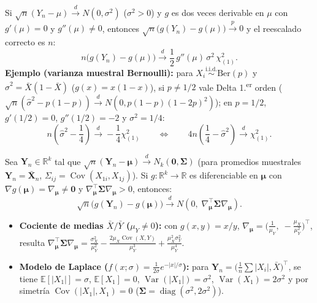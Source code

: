 \documentclass[10pt,a4paper]{article}
\newcommand{\E}{\mathbb{E}}
\newcommand{\R}{\mathbb{R}}
\newcommand{\Var}{\operatorname{Var}}
\newcommand{\Cov}{\operatorname{Cov}}
\newcommand{\iid}{\overset{\text{i.i.d.}}{\sim}}
\newcommand{\dto}{\xrightarrow{\;d\;}}
\newcommand{\pto}{\xrightarrow{\;p\;}}
\begin{document}
\begin{thmbox}[frametitle={Método Delta de 2.\textsuperscript{o} orden (caso degenerado $g'(\mu) = 0$)}]
Si $\sqrt{n}(Y_n - \mu) \dto N(0, \sigma^2)$ ($\sigma^2 > 0$) y $g$ es dos veces derivable en $\mu$ con $g'(\mu) = 0$ y $g''(\mu) \ne 0$, entonces $\sqrt{n}\big(g(Y_n) - g(\mu)\big) \pto 0$ y el reescalado correcto es $n$:
\[
n\big(g(Y_n) - g(\mu)\big) \dto \frac{1}{2}\,g''(\mu)\,\sigma^2\,\chi^2_{(1)}.
\]
\textbf{Ejemplo (varianza muestral Bernoulli):} para $X_i \iid \text{Ber}(p)$ y $\hat\sigma^2 = \bar X(1 - \bar X)$ ($g(x)=x(1-x)$), si $p \ne 1/2$ vale Delta 1.\textsuperscript{er} orden ($\sqrt{n}(\hat\sigma^2 - p(1-p)) \dto N(0, p(1-p)(1-2p)^2)$); en $p = 1/2$, $g'(1/2) = 0$, $g''(1/2) = -2$ y $\sigma^2 = 1/4$:
\[
n\left(\hat\sigma^2 - \frac{1}{4}\right) \dto -\frac{1}{4}\chi^2_{(1)} \qquad\Longleftrightarrow\qquad 4n\left(\frac{1}{4} - \hat\sigma^2\right) \dto \chi^2_{(1)}.
\]
\end{thmbox}

\begin{thmbox}[frametitle={Método Delta Multivariado}]
Sea $\mathbf{Y}_n \in \R^k$ tal que $\sqrt{n}(\mathbf{Y}_n - \boldsymbol{\mu}) \dto N_k(\mathbf{0}, \boldsymbol{\Sigma})$ (para promedios muestrales $\mathbf{Y}_n = \bar{\mathbf{X}}_n$, $\Sigma_{ij} = \Cov(X_{1i}, X_{1j})$). Si $g: \R^k \to \R$ es diferenciable en $\boldsymbol{\mu}$ con $\nabla g(\boldsymbol{\mu}) = \nabla_{\boldsymbol{\mu}} \ne \mathbf{0}$ y $\nabla_{\boldsymbol{\mu}}^\top \boldsymbol{\Sigma} \nabla_{\boldsymbol{\mu}} > 0$, entonces:
\[
\sqrt{n}\big(g(\mathbf{Y}_n) - g(\boldsymbol{\mu})\big) \dto N\!\left(0,\; \nabla_{\boldsymbol{\mu}}^\top \boldsymbol{\Sigma} \nabla_{\boldsymbol{\mu}}\right).
\]
\begin{itemize}
  \item \textbf{Cociente de medias $\bar X / \bar Y$ ($\mu_Y \ne 0$):} con $g(x,y)=x/y$, $\nabla_{\boldsymbol{\mu}} = \big(\frac{1}{\mu_Y},\; -\frac{\mu_X}{\mu_Y^2}\big)^\top$, resulta $\nabla_{\boldsymbol{\mu}}^\top \boldsymbol{\Sigma} \nabla_{\boldsymbol{\mu}} = \frac{\sigma_X^2}{\mu_Y^2} - \frac{2\mu_X\Cov(X,Y)}{\mu_Y^3} + \frac{\mu_X^2\sigma_Y^2}{\mu_Y^4}$.
  \item \textbf{Modelo de Laplace ($f(x;\sigma) = \frac{1}{2\sigma}e^{-|x|/\sigma}$):} para $\mathbf{Y}_n = \big(\frac{1}{n}\sum |X_i|, \bar X\big)^\top$, se tiene $\E[|X_1|]=\sigma$, $\E[X_1]=0$, $\Var(|X_1|)=\sigma^2$, $\Var(X_1)=2\sigma^2$ y por simetría $\Cov(|X_1|, X_1) = 0$ ($\boldsymbol{\Sigma} = \operatorname{diag}(\sigma^2, 2\sigma^2)$).
\end{itemize}
\end{thmbox}
\end{document}
